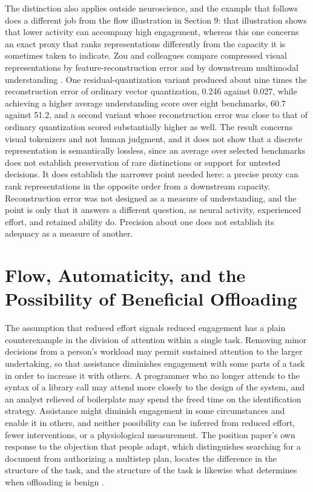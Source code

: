 \documentclass[11pt]{article}
\begin{document}
The distinction also applies outside neuroscience, and the example that follows does a different job from the flow illustration in Section 9: that illustration shows that lower activity can accompany high engagement, whereas this one concerns an exact proxy that ranks representations differently from the capacity it is sometimes taken to indicate. Zou and colleagues compare compressed visual representations by feature-reconstruction error and by downstream multimodal understanding \cite{zou}. One residual-quantization variant produced about nine times the reconstruction error of ordinary vector quantization, 0.246 against 0.027, while achieving a higher average understanding score over eight benchmarks, 60.7 against 51.2, and a second variant whose reconstruction error was close to that of ordinary quantization scored substantially higher as well. The result concerns visual tokenizers and not human judgment, and it does not show that a discrete representation is semantically lossless, since an average over selected benchmarks does not establish preservation of rare distinctions or support for untested decisions. It does establish the narrower point needed here: a precise proxy can rank representations in the opposite order from a downstream capacity. Reconstruction error was not designed as a measure of understanding, and the point is only that it answers a different question, as neural activity, experienced effort, and retained ability do. Precision about one does not establish its adequacy as a measure of another.

\section{Flow, Automaticity, and the Possibility of Beneficial Offloading}

The assumption that reduced effort signals reduced engagement has a plain counterexample in the division of attention within a single task. Removing minor decisions from a person's workload may permit sustained attention to the larger undertaking, so that assistance diminishes engagement with some parts of a task in order to increase it with others. A programmer who no longer attends to the syntax of a library call may attend more closely to the design of the system, and an analyst relieved of boilerplate may spend the freed time on the identification strategy. Assistance might diminish engagement in some circumstances and enable it in others, and neither possibility can be inferred from reduced effort, fewer interventions, or a physiological measurement. The position paper's own response to the objection that people adapt, which distinguishes searching for a document from authorizing a multistep plan, locates the difference in the structure of the task, and the structure of the task is likewise what determines when offloading is benign \cite{mitchell}.
\end{document}
